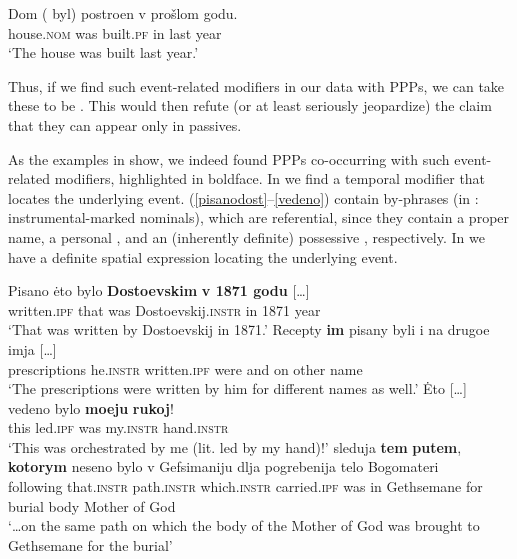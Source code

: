 \documentclass[output=paper,modfonts,newtxmath,hidelinks
\ChapterDOI{10.5281/zenodo.2545513}
]{langscibook}
\begin{document}
\ea\gll	Dom (\hspace{-2pt} byl) postroen v prošlom godu.\\
	house.\textsc{nom} {} was built.\textsc{pf} in last year\\
\glt `The house was built last year.'\label{dom}
\z
	
\noindent Thus, if we find such event-related modifiers in our data with  PPPs, we can take these to be . This would then refute (or at least seriously jeopardize) the claim that they can appear only in  passives. 

As the examples in  show, we indeed found  PPPs co-occurring with such event-related modifiers, highlighted in boldface. In  we find a temporal modifier that locates the underlying event. (\ref{pisanodost}--\ref{vedeno}) contain by-phrases (in : instrumental-marked nominals), which are referential, since they contain a proper name, a personal , and an (inherently definite) possessive , respectively. In  we have a definite spatial expression locating the underlying event.

\ea\label{pisano}
\ea\gll	Pisano \.{e}to bylo \textbf{Dostoevskim} \textbf{v 1871 godu} [\dots]\\ 
	written.\textsc{ipf} that was Dostoevskij.\textsc{instr} {in 1871 year} \\
\glt	`That was written by Dostoevskij in 1871.'\label{pisanodost}
\ex\gll	Recepty \textbf{im} pisany byli i na drugoe imja [\dots]\\ 
	prescriptions he.\textsc{instr} written.\textsc{ipf} were and on other name \\ 
\glt	`The prescriptions were written by him for different names as well.'\label{pisanoim}
\ex\gll 	\.{E}to [\dots] vedeno bylo \textbf{moeju} \textbf{rukoj}!\\
	this {} led.\textsc{ipf} was my.\textsc{instr} hand.\textsc{instr}\\
\glt	`This was orchestrated by me (lit. led by my hand)!'\label{vedeno} 
\ex\gll	[\dots] sleduja \textbf{tem} \textbf{putem}, \textbf{kotorym} neseno bylo v Gefsimaniju dlja pogrebenija telo Bogomateri\\
	{} following that.\textsc{instr} path.\textsc{instr} which.\textsc{instr} carried.\textsc{ipf} was in Gethsemane for burial body {Mother of God} \\
\glt	`\dots on the same path on which the body of the Mother of God was brought to Gethsemane for the burial'\label{Sion}
\z\z
\end{document}
